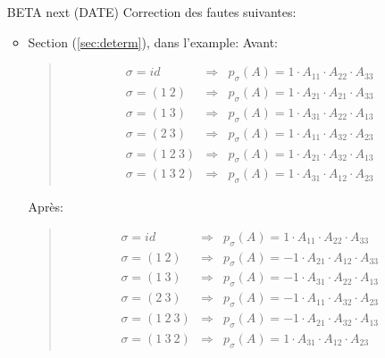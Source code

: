 \begin{itemize}
    \item[BETA next (DATE)] Correction des fautes suivantes:
    \begin{itemize}
      \item Section (\ref{sec:determ}), dans l'example: Avant:
        \begin{quote}
          \begin{eqnarray*}
            \sigma = id           &\Rightarrow& p_{\sigma}(A) = 1 \cdot A_{11} \cdot A_{22} \cdot A_{33} \\
            \sigma = (1 ~ 2)      &\Rightarrow& p_{\sigma}(A) = 1 \cdot A_{21} \cdot A_{21} \cdot A_{33} \\
            \sigma = (1 ~ 3)      &\Rightarrow& p_{\sigma}(A) = 1 \cdot A_{31} \cdot A_{22} \cdot A_{13} \\
            \sigma = (2 ~ 3)      &\Rightarrow& p_{\sigma}(A) = 1 \cdot A_{11} \cdot A_{32} \cdot A_{23} \\
            \sigma = (1 ~ 2 ~ 3)  &\Rightarrow& p_{\sigma}(A) = 1 \cdot A_{21} \cdot A_{32} \cdot A_{13} \\
            \sigma = (1 ~ 3 ~ 2)  &\Rightarrow& p_{\sigma}(A) = 1 \cdot A_{31} \cdot A_{12} \cdot A_{23}
          \end{eqnarray*}
        \end{quote}
        Après:
        \begin{quote}
          \begin{eqnarray*}
            \sigma = id           &\Rightarrow& p_{\sigma}(A) = 1 \cdot A_{11} \cdot A_{22} \cdot A_{33} \\
            \sigma = (1 ~ 2)      &\Rightarrow& p_{\sigma}(A) = -1 \cdot A_{21} \cdot A_{12} \cdot A_{33} \\
            \sigma = (1 ~ 3)      &\Rightarrow& p_{\sigma}(A) = -1 \cdot A_{31} \cdot A_{22} \cdot A_{13} \\
            \sigma = (2 ~ 3)      &\Rightarrow& p_{\sigma}(A) = -1 \cdot A_{11} \cdot A_{32} \cdot A_{23} \\
            \sigma = (1 ~ 2 ~ 3)  &\Rightarrow& p_{\sigma}(A) = -1 \cdot A_{21} \cdot A_{32} \cdot A_{13} \\
            \sigma = (1 ~ 3 ~ 2)  &\Rightarrow& p_{\sigma}(A) = 1 \cdot A_{31} \cdot A_{12} \cdot A_{23}
          \end{eqnarray*}
        \end{quote}
        
    \end{itemize}
\end{itemize}
